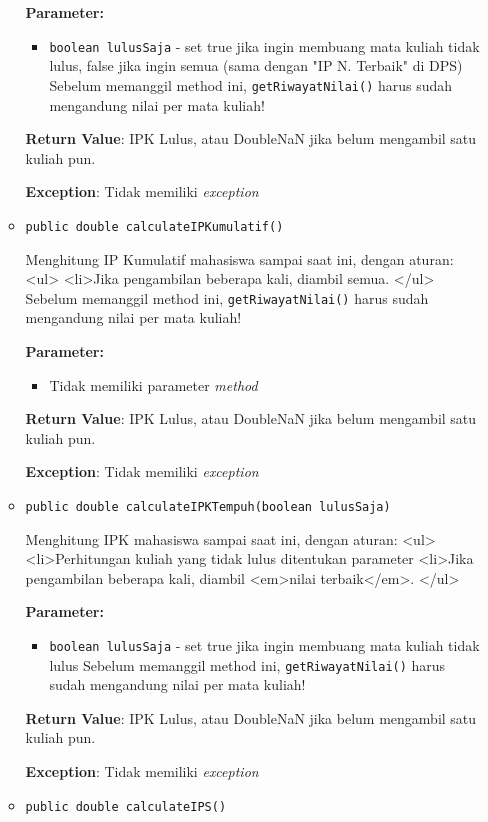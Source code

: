 \documentclass{article}
\begin{document}
\begin{enumerate}
\begin{itemize}
\textbf{Parameter:}
\begin{itemize}
\item \texttt{boolean lulusSaja} - 
set true jika ingin membuang mata kuliah tidak lulus, false jika ingin semua (sama dengan "IP N. Terbaik" di DPS)
 Sebelum memanggil method ini, \texttt{getRiwayatNilai()} harus sudah mengandung nilai per mata kuliah!
\end{itemize}
\textbf{Return Value}: IPK Lulus, atau  DoubleNaN jika belum mengambil satu kuliah pun.

\textbf{Exception}: Tidak memiliki \textit{exception}

\item \texttt{public double calculateIPKumulatif()}

Menghitung IP Kumulatif mahasiswa sampai saat ini, dengan aturan:
 <ul>
   <li>Jika pengambilan beberapa kali, diambil semua.
 </ul>
 Sebelum memanggil method ini, \texttt{getRiwayatNilai()} harus sudah mengandung nilai per mata kuliah!

\textbf{Parameter:}
\begin{itemize}
\item Tidak memiliki parameter \textit{method}
\end{itemize}
\textbf{Return Value}: IPK Lulus, atau  DoubleNaN jika belum mengambil satu kuliah pun.

\textbf{Exception}: Tidak memiliki \textit{exception}

\item \texttt{public double calculateIPKTempuh(boolean lulusSaja)}

Menghitung IPK mahasiswa sampai saat ini, dengan aturan:
 <ul>
   <li>Perhitungan kuliah yang tidak lulus ditentukan parameter
   <li>Jika pengambilan beberapa kali, diambil <em>nilai terbaik</em>.
 </ul>

\textbf{Parameter:}
\begin{itemize}
\item \texttt{boolean lulusSaja} - 
set true jika ingin membuang mata kuliah tidak lulus 
 Sebelum memanggil method ini, \texttt{getRiwayatNilai()} harus sudah mengandung nilai per mata kuliah!
\end{itemize}
\textbf{Return Value}: IPK Lulus, atau  DoubleNaN jika belum mengambil satu kuliah pun.

\textbf{Exception}: Tidak memiliki \textit{exception}

\item \texttt{public double calculateIPS()}


\end{itemize}
\end{enumerate}
\end{document}
